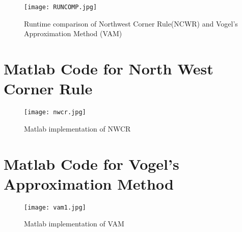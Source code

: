 \documentclass[12pt]{article}
\theoremstyle{definition}
\theoremstyle{definition}
\numberwithin{equation}{section}
\begin{document}
\begin{figure}[ht]
\texttt{[image: RUNCOMP.jpg]}
\caption{Runtime comparison of Northwest Corner Rule(NCWR) and Vogel's Approximation Method (VAM) }
\end{figure}



\begin{appendices}
\section{Matlab Code for North West Corner Rule}
\begin{figure}[H]
\texttt{[image: nwcr.jpg]}
\caption{Matlab implementation of NWCR }
\end{figure}
\vspace{5mm}
\pagebreak

\section{Matlab Code for Vogel's Approximation Method}
\begin{figure}[H]
\texttt{[image: vam1.jpg]}
\caption{Matlab implementation of VAM }
\end{figure}
\end{appendices}
\end{document}
